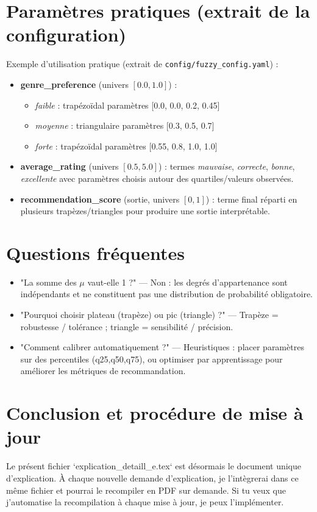 \documentclass[a4paper,11pt]{article}
\begin{document}
\section{Paramètres pratiques (extrait de la configuration)}
Exemple d'utilisation pratique (extrait de \texttt{config/fuzzy\_config.yaml}) :
\begin{itemize}
    \item \textbf{genre\_preference} (univers $[0.0,1.0]$) :
        \begin{itemize}
            \item \emph{faible} : trapézoïdal paramètres [0.0, 0.0, 0.2, 0.45]
            \item \emph{moyenne} : triangulaire paramètres [0.3, 0.5, 0.7]
            \item \emph{forte} : trapézoïdal paramètres [0.55, 0.8, 1.0, 1.0]
        \end{itemize}
    \item \textbf{average\_rating} (univers $[0.5,5.0]$) : termes \emph{mauvaise}, \emph{correcte}, \emph{bonne}, \emph{excellente} avec paramètres choisis autour des quartiles/valeurs observées.
    \item \textbf{recommendation\_score} (sortie, univers $[0,1]$) : terme final réparti en plusieurs trapèzes/triangles pour produire une sortie interprétable.
\end{itemize}

\section{Questions fréquentes}
\begin{itemize}
    \item "La somme des $\mu$ vaut-elle 1 ?" — Non : les degrés d'appartenance sont indépendants et ne constituent pas une distribution de probabilité obligatoire.
    \item "Pourquoi choisir plateau (trapèze) ou pic (triangle) ?" — Trapèze = robustesse / tolérance ; triangle = sensibilité / précision.
    \item "Comment calibrer automatiquement ?" — Heuristiques : placer paramètres sur des percentiles (q25,q50,q75), ou optimiser par apprentissage pour améliorer les métriques de recommandation.
\end{itemize}

\section*{Conclusion et procédure de mise à jour}
Le présent fichier `explication\_detaill\_e.tex` est désormais le document unique d'explication. À chaque nouvelle demande d'explication, je l'intègrerai dans ce même fichier et pourrai le recompiler en PDF sur demande. Si tu veux que j'automatise la recompilation à chaque mise à jour, je peux l'implémenter.
\end{document}
